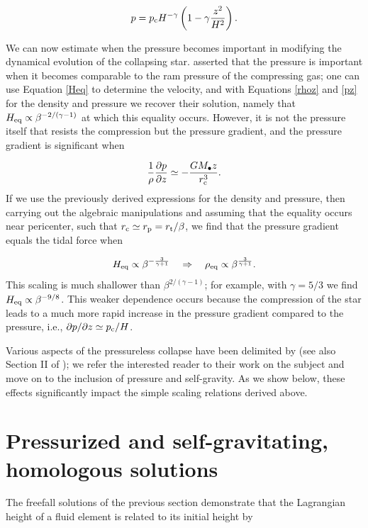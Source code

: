 \documentclass[twocolumn]{aastex62}
\begin{document}
\begin{equation}
p = p_{\rm c} H^{-\gamma}\left(1-\gamma\frac{z^2}{H^2}\right). \label{pz}
\end{equation}

We can now estimate when the pressure becomes important in modifying the dynamical evolution of the collapsing star. \citet{carter83} asserted that the pressure is important when it becomes comparable to the ram pressure of the compressing gas; one can use Equation \eqref{Heq} to determine the velocity, and with Equations \eqref{rhoz} and \eqref{pz} for the density and pressure we recover their solution, namely that $H_{\rm eq} \propto \beta^{-2/(\gamma-1)}$ at which this equality occurs. However, it is not the pressure itself that resists the compression but the pressure gradient, and the pressure gradient is significant when

\begin{equation}
\frac{1}{\rho}\frac{\partial p}{\partial z} \simeq -\frac{GM_{\bullet}z}{r_{\rm c}^3}.
\end{equation}
If we use the previously derived expressions for the density and pressure, then carrying out the algebraic manipulations and assuming that the equality occurs near pericenter, such that $r_{\rm c} \simeq r_{\rm p} = r_{\rm t}/\beta$, we find that the pressure gradient equals the tidal force when

\begin{equation}
H_{\rm eq} \propto \beta^{-\frac{3}{\gamma+1}} \quad \Rightarrow \quad \rho_{\rm eq} \propto \beta^{\frac{3}{\gamma+1}}.
\end{equation}
This scaling is {much shallower} than $\beta^{2/(\gamma-1)}$; for example, with $\gamma = 5/3$ we find $H_{\rm eq} \propto \beta^{-9/8}$. This weaker dependence occurs because the compression of the star leads to a much more rapid increase in the pressure gradient compared to the pressure, i.e., $\partial p/\partial z \simeq p_{\rm c}/H$.

Various aspects of the pressureless collapse have been delimited by \citet{Stone:2013aa} (see also Section II of \citealt{Bicknell:1983aa}); we refer the interested reader to their work on the subject and move on to the inclusion of pressure and self-gravity. As we show below, these effects significantly impact the simple scaling relations derived above.

\section{Pressurized and self-gravitating, homologous solutions}
\label{sec:homologous}
The freefall solutions of the previous section demonstrate that the Lagrangian height of a fluid element is related to its initial height by
\end{document}
